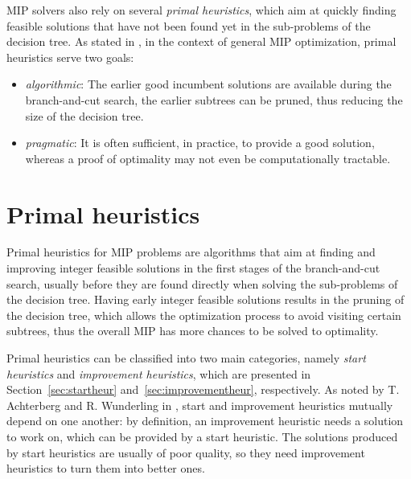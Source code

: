 \documentclass[a4paper,12pt,twoside]{scrbook}
\begin{document}
MIP solvers also rely on several \textit{primal heuristics}, which aim at quickly finding feasible solutions that have not been found yet in the sub-problems of the decision tree.
As stated in \cite{achterberg2013}, in the context of general MIP optimization, primal heuristics serve two goals:
\begin{itemize}
	\item \textit{algorithmic}: The earlier good incumbent solutions are available during the branch-and-cut search, the earlier subtrees can be pruned, thus reducing the size of the decision tree.
	\item \textit{pragmatic}: It is often sufficient, in practice, to provide a good solution, whereas a proof of optimality may not even be computationally tractable.
\end{itemize}

\chapter{Primal heuristics}
Primal heuristics for MIP problems are algorithms that aim at finding and improving integer feasible solutions in the first stages of the branch-and-cut search, usually before they are found directly when solving the sub-problems of the decision tree. Having early integer feasible solutions results in the pruning of the decision tree, which allows the optimization process to avoid visiting certain subtrees, thus the overall MIP has more chances to be solved to optimality. \par 
Primal heuristics can be classified into two main categories, namely \textit{start heuristics} and \textit{improvement heuristics}, which are presented in Section~\ref{sec:startheur} and~\ref{sec:improvementheur}, respectively. As noted by T. Achterberg and R. Wunderling in \cite{achterberg2013}, start and improvement heuristics mutually depend on one another: by definition, an improvement heuristic needs a solution to work on, which can be provided by a start heuristic. The solutions produced by start heuristics are usually of poor quality, so they need improvement heuristics to turn them into better ones.
\end{document}
